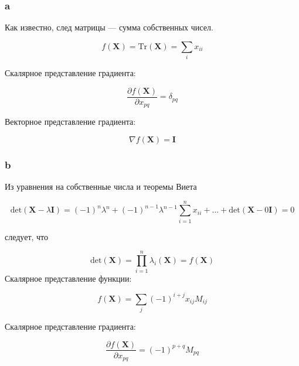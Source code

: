 	\subsubsection{a}
	
	Как известно, след матрицы --- сумма собственных чисел.
	
	\begin{equation}
	f(\mathbf{X}) = \text{Tr} (\mathbf{X}) = \sum_i x_{ii}
	\end{equation}
	
	Скалярное представление градиента:
	
	\begin{equation}
	\frac{\partial f(\mathbf{X}) }{\partial x_{pq}}  = \delta_{pq} 
	\end{equation}
	
	Векторное представление градиента:
	
	\begin{equation}
	\nabla f(\mathbf{X}) = \mathbf{I}
	\end{equation}
	
	\subsubsection{b}
	
	Из уравнения на собственные числа и теоремы Виета
	
	\begin{equation}
	\text{det}(\mathbf{X} - \lambda \mathbf{I}) = (-1)^n \lambda^n +(-1)^{n-1} \lambda^{n-1} \sum\limits_{i=1}^{n}x_{ii} + ... + \text{det} (\mathbf{X} - 0 \mathbf{I} )= 0
	\end{equation}
	
	следует, что 
	
	\begin{equation}
	\text{det} (\mathbf{X} )= \prod\limits_{i=1}^n \lambda_i  (\mathbf{X}) =
	f(\mathbf{X})
	\end{equation}
	Скалярное представление функции:
	
	\begin{equation}
	f(\mathbf{X}) = \sum_j (-1)^{i+j} x_{ij} M_{ij}
	\end{equation}
	
	Скалярное представление градиента:
	
	\begin{equation}
	\frac{\partial f(\mathbf{X}) }{\partial x_{pq}} = (-1)^{p+q}  M_{pq}
	\end{equation}
	
